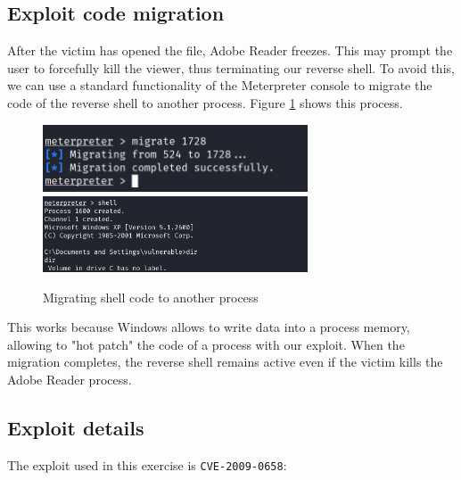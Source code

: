 \subsection{Exploit code migration}
\label{subsec:ex3:exploit-code-migration}

After the victim has opened the file, Adobe Reader freezes. This may prompt the user to forcefully kill the viewer, thus terminating our reverse shell. To avoid this, we can use a standard functionality of the Meterpreter console to migrate the code of the reverse shell to another process. Figure \ref{fig:ex3:migrating-shell} shows this process.

\begin{figure}[htbp]
    \centering
    \includegraphics[width=0.7\textwidth]{../drawable/exercise_3_screenshots/meterpreter_migration.png}
    \includegraphics[width=0.7\textwidth]{../drawable/exercise_3_screenshots/meterpreter_shell_opened_cropped.png}
    \caption{Migrating shell code to another process}
    \label{fig:ex3:migrating-shell}
\end{figure}

This works because Windows allows to write data into a process memory, allowing to "hot patch" the code of a process with our exploit. When the migration completes, the reverse shell remains active even if the victim kills the Adobe Reader process.

\subsection{Exploit details}
\label{subsec:ex3:exploit-details}
 The exploit used in this exercise is \texttt{CVE-2009-0658}: 
\medskip
\begin{center}
\noindent{}
\end{center}
\medskip

